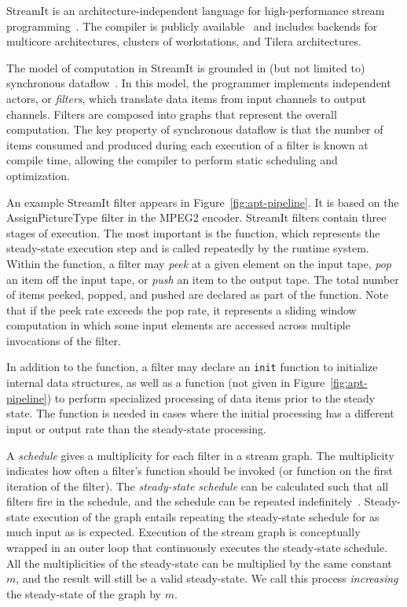 StreamIt is an architecture-independent language for high-performance
stream programming~\cite{thies-cc02}.  The compiler is publicly
available~\cite{streamitweb} and includes backends for multicore
architectures, clusters of workstations, and Tilera architectures.

The model of computation in StreamIt is grounded in (but not limited
to) synchronous dataflow~\cite{lee87}.  In this model, the programmer
implements independent actors, or {\it filters}, which translate data
items from input channels to output channels.  Filters are composed
into graphs that represent the overall computation.  The key property
of synchronous dataflow is that the number of items consumed and
produced during each execution of a filter is known at compile time,
allowing the compiler to perform static scheduling and optimization.

An example StreamIt filter appears in Figure~\ref{fig:apt-pipeline}.
It is based on the AssignPictureType filter in the MPEG2 encoder.
StreamIt filters contain three stages of execution.  The most
important is the \work function, which represents the
steady-state execution step and is called repeatedly by the runtime
system.  Within the \work function, a filter may {\it peek} at a given
element on the input tape, {\it pop} an item off the input tape, or
{\it push} an item to the output tape.  The total number of items
peeked, popped, and pushed are declared as part of the \work function.
Note that if the peek rate exceeds the pop rate, it represents a
sliding window computation in which some input elements are accessed
across multiple invocations of the filter.


In addition to the \work function, a filter may declare an {\tt init}
function to initialize internal data structures, as well as a 
 \prework function (not given in Figure~\ref{fig:apt-pipeline}) to
perform specialized processing of data items prior to the steady
state.  The \prework function is needed in cases where the initial
processing has a different input or output rate than the steady-state
processing.

A {\it schedule} gives a multiplicity for each filter in a stream
graph.  The multiplicity indicates how often a filter's \work function
should be invoked (or \prework function on the first iteration of the filter).  The
{\it steady-state schedule} can be calculated such that all filters
fire in the schedule, and the schedule can be repeated
indefinitely~\cite{lee87}.  Steady-state execution of the graph
entails repeating the steady-state schedule for as much input as is
expected.  Execution of the stream graph is conceptually wrapped in an
outer loop that continuously executes the steady-state schedule.  All
the multiplicities of the steady-state can be multiplied by the same
constant $m$, and the result will still be a valid steady-state.  We
call this process {\it increasing} the steady-state of the graph by
$m$.

